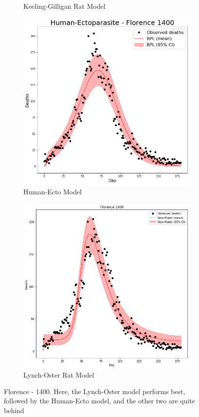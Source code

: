 \documentclass [letterpaper, 12pt] {article}
\begin{document}
\begin{figure}[H]
\begin{subfigure}{0.48\textwidth}
	\caption{Keeling-Gilligan Rat Model}
	\end{subfigure}
	\begin{subfigure}{0.48\textwidth}
	\includegraphics[width=\linewidth]{hum_ecto_florence.png}
	\caption{Human-Ecto Model}
	\end{subfigure}\hspace{\fill}
	\begin{subfigure}{0.48\textwidth}
	\includegraphics[width=\linewidth]{rats2_lynch_oster_florence.png}
	\caption{Lynch-Oster Rat Model}
	\end{subfigure}
	\caption{Florence - 1400. Here, the Lynch-Oster model performs best, followed by the Human-Ecto model, and the other two are quite behind}
\end{figure}
\end{document}
